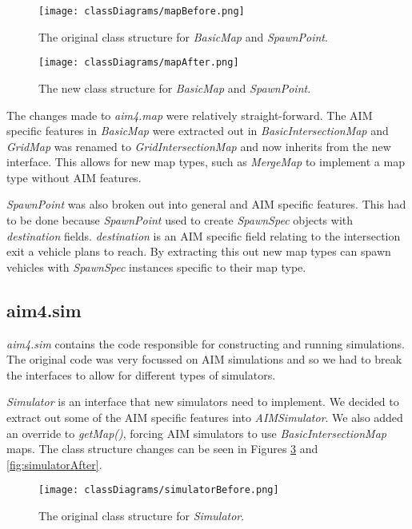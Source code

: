 \begin{appendices}
\begin{figure}[htb]
\centering
\texttt{[image: classDiagrams/mapBefore.png]}
\caption{The original class structure for \emph{BasicMap} and \emph{SpawnPoint}.}
\label{fig:mapBefore}
\end{figure}

\begin{figure}[htb]
\centering
\texttt{[image: classDiagrams/mapAfter.png]}
\caption{The new class structure for \emph{BasicMap} and \emph{SpawnPoint}.}
\label{fig:mapAfter}
\end{figure}

The changes made to \emph{aim4.map} were relatively straight-forward. The AIM specific features in \emph{BasicMap} were extracted out in \emph{BasicIntersectionMap} and \emph{GridMap} was renamed to \emph{GridIntersectionMap} and now inherits from the new interface. This allows for new map types, such as \emph{MergeMap} to implement a map type without AIM features.

\emph{SpawnPoint} was also broken out into general and AIM specific features. This had to be done because \emph{SpawnPoint} used to create \emph{SpawnSpec} objects with \emph{destination} fields. \emph{destination} is an AIM specific field relating to the intersection exit a vehicle plans to reach. By extracting this out new map types can spawn vehicles with \emph{SpawnSpec} instances specific to their map type.

\FloatBarrier
\subsection{aim4.sim}
\label{subsec:aim4.sim}
\emph{aim4.sim} contains the code responsible for constructing and running simulations. The original code was very focussed on AIM simulations and so we had to break the interfaces to allow for different types of simulators. 

\emph{Simulator} is an interface that new simulators need to implement. We decided to extract out some of the AIM specific features into \emph{AIMSimulator}. We also added an override to \emph{getMap()}, forcing AIM simulators to use \emph{BasicIntersectionMap} maps. The class structure changes can be seen in Figures \ref{fig:simulatorBefore} and \ref{fig:simulatorAfter}.

\begin{figure}[htb]
\centering
\texttt{[image: classDiagrams/simulatorBefore.png]}
\caption{The original class structure for \emph{Simulator}.}
\label{fig:simulatorBefore}
\end{figure}


\end{appendices}

